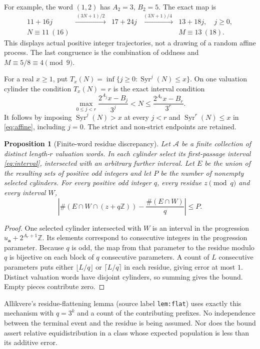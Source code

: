 \documentclass[11pt]{article}
\newtheorem{proposition}{Proposition}
\theoremstyle{remark}\newtheorem{remark}[proposition]{Remark}
\newcommand{\ZZ}{\mathbb Z}
\newcommand{\Syr}{\operatorname{Syr}}
\begin{document}
For example, the word $(1,2)$ has $A_2=3$, $B_2=5$. The exact map is
\[
 \begin{array}{ccccc}
 11+16j &\xrightarrow{\ (3N+1)/2\ }&17+24j
 &\xrightarrow{\ (3N+1)/4\ }&13+18j,\quad j\geq0,\\[3pt]
 N\equiv11\ (16)&&&&M\equiv13\ (18).
 \end{array}
\]
This displays actual positive integer trajectories, not a drawing of a
random affine process. The last congruence is the combination of oddness
and $M\equiv5/8\equiv4\pmod9$.

For a real $x\geq1$, put $T_x(N)=\inf\{j\geq0:\Syr^j(N)\leq x\}$.
On one valuation cylinder the condition $T_x(N)=r$ is the exact interval
condition
\begin{equation}\label{eq:interval}
 \max_{0\leq j<r}\frac{2^{A_j}x-B_j}{3^j}<N
 \leq\frac{2^{A_r}x-B_r}{3^r}.
\end{equation}
It follows by imposing $\Syr^j(N)>x$ at every $j<r$ and
$\Syr^r(N)\leq x$ in \eqref{eq:affine}, including $j=0$.
The strict and non-strict endpoints are retained.

\begin{proposition}[Finite-word residue discrepancy]\label{prop:crt}
Let $\mathcal A$ be a finite collection of distinct length-$r$ valuation
words. In each cylinder select its first-passage interval
\eqref{eq:interval}, intersected with an arbitrary further interval.
Let $E$ be the union of the resulting sets of positive odd integers and
let $P$ be the number of nonempty selected cylinders. For every positive
odd integer $q$, every residue $z\pmod q$ and every interval $W$,
\[
 \left|\#(E\cap W\cap(z+q\ZZ))-\frac{\#(E\cap W)}q\right|\leq P.
\]
\end{proposition}
\begin{proof}
One selected cylinder intersected with $W$ is an interval in the
progression $u_{\mathbf a}+2^{A_r+1}\ZZ$. Its elements correspond to
consecutive integers in the progression parameter. Because $q$ is odd,
the map from that parameter to the residue modulo $q$ is bijective on
each block of $q$ consecutive parameters. A count of $L$ consecutive
parameters puts either $\lfloor L/q\rfloor$ or $\lceil L/q\rceil$ in
each residue, giving error at most $1$. Distinct valuation words have
disjoint cylinders, so summing gives the bound. Empty pieces contribute
zero.
\end{proof}

Allikvere's residue-flattening lemma (source label \texttt{lem:flat}) uses
exactly this mechanism with $q=3^k$ and a count of the contributing
prefixes. No independence between the terminal event and the residue is
being assumed. Nor does the bound assert relative equidistribution in a
class whose expected population is less than its additive error.
\end{document}
